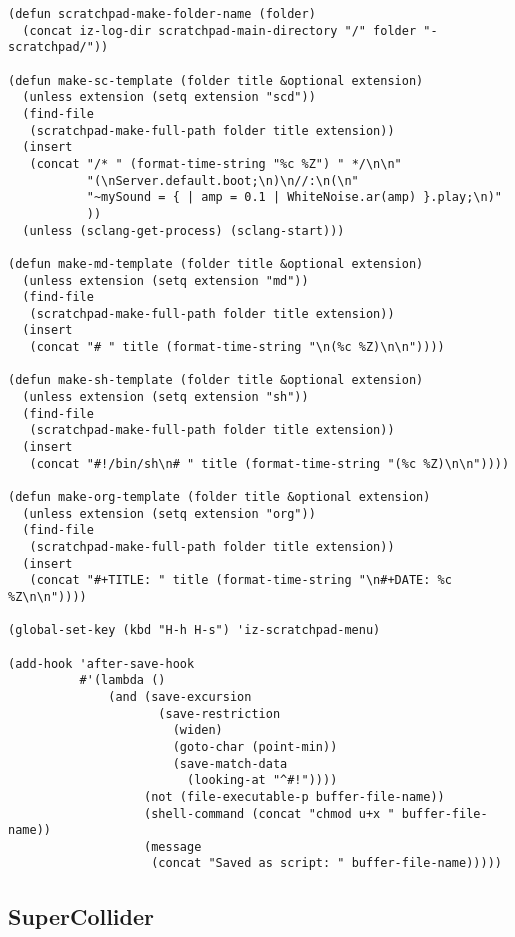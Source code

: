 \documentclass[nofonts]{tufte-handout}
\begin{document}
\begin{verbatim}
(defun scratchpad-make-folder-name (folder)
  (concat iz-log-dir scratchpad-main-directory "/" folder "-scratchpad/"))

(defun make-sc-template (folder title &optional extension)
  (unless extension (setq extension "scd"))
  (find-file
   (scratchpad-make-full-path folder title extension))
  (insert
   (concat "/* " (format-time-string "%c %Z") " */\n\n"
           "(\nServer.default.boot;\n)\n//:\n(\n"
           "~mySound = { | amp = 0.1 | WhiteNoise.ar(amp) }.play;\n)"
           ))
  (unless (sclang-get-process) (sclang-start)))

(defun make-md-template (folder title &optional extension)
  (unless extension (setq extension "md"))
  (find-file
   (scratchpad-make-full-path folder title extension))
  (insert
   (concat "# " title (format-time-string "\n(%c %Z)\n\n"))))

(defun make-sh-template (folder title &optional extension)
  (unless extension (setq extension "sh"))
  (find-file
   (scratchpad-make-full-path folder title extension))
  (insert
   (concat "#!/bin/sh\n# " title (format-time-string "(%c %Z)\n\n"))))

(defun make-org-template (folder title &optional extension)
  (unless extension (setq extension "org"))
  (find-file
   (scratchpad-make-full-path folder title extension))
  (insert
   (concat "#+TITLE: " title (format-time-string "\n#+DATE: %c %Z\n\n"))))

(global-set-key (kbd "H-h H-s") 'iz-scratchpad-menu)

(add-hook 'after-save-hook
          #'(lambda ()
              (and (save-excursion
                     (save-restriction
                       (widen)
                       (goto-char (point-min))
                       (save-match-data
                         (looking-at "^#!"))))
                   (not (file-executable-p buffer-file-name))
                   (shell-command (concat "chmod u+x " buffer-file-name))
                   (message
                    (concat "Saved as script: " buffer-file-name)))))
\end{verbatim}

\subsection{SuperCollider}
\label{sec-2-2}
\end{document}
